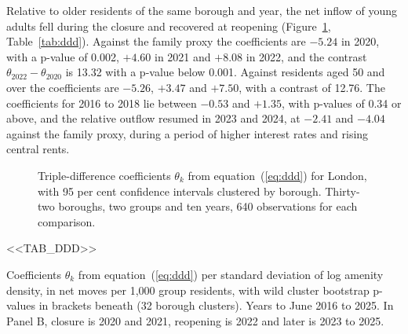 \documentclass[11pt,a4paper]{article}
\newcommand{\tabnote}[1]{\par\smallskip\parbox{\linewidth}{\footnotesize #1}}
\begin{document}
Relative to older residents of the same borough and year, the net inflow of young adults fell during the closure and recovered at reopening (Figure~\ref{fig:ddd}, Table~\ref{tab:ddd}). Against the family proxy the coefficients are $-5.24$ in 2020, with a p-value of 0.002, $+4.60$ in 2021 and $+8.08$ in 2022, and the contrast $\theta_{2022} - \theta_{2020}$ is 13.32 with a p-value below 0.001. Against residents aged 50 and over the coefficients are $-5.26$, $+3.47$ and $+7.50$, with a contrast of 12.76. The coefficients for 2016 to 2018 lie between $-0.53$ and $+1.35$, with p-values of 0.34 or above, and the relative outflow resumed in 2023 and 2024, at $-2.41$ and $-4.04$ against the family proxy, during a period of higher interest rates and rising central rents.

\begin{figure}[htbp]
\centering
{}
\caption{Triple-difference coefficients $\theta_k$ from equation~(\ref{eq:ddd}) for London, with 95 per cent confidence intervals clustered by borough. Thirty-two boroughs, two groups and ten years, 640 observations for each comparison.}\label{fig:ddd}
\end{figure}

\begin{table}[htbp]
\centering
\caption{Triple difference, young adults against older residents of the same borough}\label{tab:ddd}
\small
<<TAB_DDD>>
\tabnote{Coefficients $\theta_k$ from equation~(\ref{eq:ddd}) per standard deviation of log amenity density, in net moves per 1,000 group residents, with wild cluster bootstrap p-values in brackets beneath (32 borough clusters). Years to June 2016 to 2025. In Panel B, closure is 2020 and 2021, reopening is 2022 and later is 2023 to 2025.}
\end{table}
\end{document}
